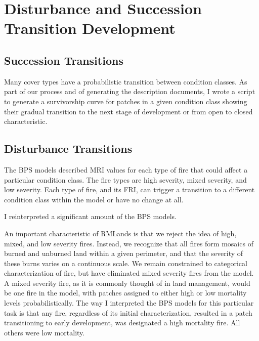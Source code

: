 \chapter{Disturbance and Succession Transition Development}

\section{Succession Transitions}
Many cover types have a probabilistic transition between condition classes. As part of our process and of generating the description documents, I wrote a script to generate a survivorship curve for patches in a given condition class showing their gradual transition to the next stage of development or from open to closed characteristic.

\section{Disturbance Transitions}
The BPS models described MRI values for each type of fire that could affect a particular condition class. The fire types are high severity, mixed severity, and low severity. Each type of fire, and its FRI, can trigger a transition to a different condition class within the model or have no change at all.

I reinterpreted a significant amount of the BPS models.

An important characteristic of RMLands is that we reject the idea of high, mixed, and low severity fires. Instead, we recognize that all fires form mosaics of burned and unburned land within a given perimeter, and that the severity of these burns varies on a continuous scale. We remain constrained to categorical characterization of fire, but have eliminated mixed severity fires from the model. A mixed severity fire, as it is commonly thought of in land management, would be one fire in the model, with patches assigned to either high or low mortality levels probabilistically. The way I interpreted the BPS models for this particular task is that any fire, regardless of its initial characterization, resulted in a patch transitioning to early development, was designated a high mortality fire. All others were low mortality.

